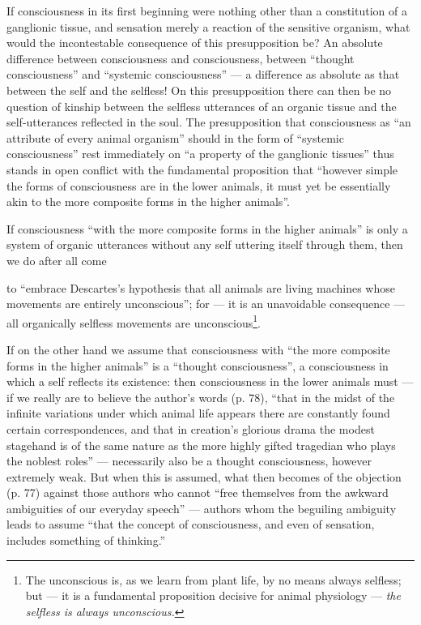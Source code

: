 \documentclass[12pt,a4paper]{book}
\begin{document}
If consciousness in its first beginning were nothing other than a constitution of a
ganglionic tissue, and sensation merely a reaction of the sensitive organism, what
would the incontestable consequence of this presupposition be? An absolute difference
between consciousness and consciousness, between ``thought consciousness'' and
``systemic consciousness'' --- a difference as absolute as that between the self and
the selfless! On this presupposition there can then be no question of kinship between
the selfless utterances of an organic tissue and the self-utterances reflected in the
soul. The presupposition that consciousness as ``an attribute of every animal
organism'' should in the form of ``systemic consciousness'' rest immediately on ``a
property of the ganglionic tissues'' thus stands in open conflict with the
fundamental proposition that ``however simple the forms of consciousness are in the
lower animals, it must yet be essentially akin to the more composite forms in the
higher animals''.

If consciousness ``with the more composite forms in the higher animals'' is only a
system of organic utterances without any self uttering itself through them, then we
do after all come

\setcounter{footnote}{0}
to ``embrace Descartes's hypothesis that all animals are living machines whose
movements are entirely unconscious''; for --- it is an unavoidable consequence ---
all organically selfless movements are unconscious\footnote{The unconscious is, as we
learn from plant life, by no means always selfless; but --- it is a fundamental
proposition decisive for animal physiology --- \emph{the selfless is always
unconscious.}}.

If on the other hand we assume that consciousness with ``the more composite forms in
the higher animals'' is a ``thought consciousness'', a consciousness in which a self
reflects its existence: then consciousness in the lower animals must --- if we really
are to believe the author's words (p. 78), ``that in the midst of the infinite
variations under which animal life appears there are constantly found certain
correspondences, and that in creation's glorious drama the modest stagehand is of the
same nature as the more highly gifted tragedian who plays the noblest roles'' ---
necessarily also be a thought consciousness, however extremely weak. But when this is
assumed, what then becomes of the objection (p. 77) against those authors who cannot
``free themselves from the awkward ambiguities of our everyday speech'' --- authors
whom the beguiling ambiguity leads to assume ``that the concept of consciousness, and
even of sensation, includes something of thinking.''
\end{document}
